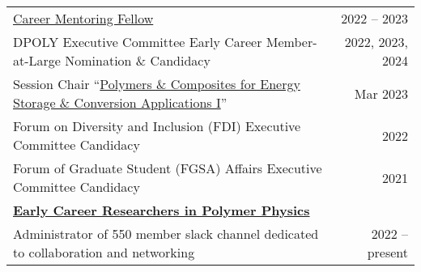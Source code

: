 \documentclass[letterpaper,11pt]{article}
\begin{document}
\begin{longtable}{@{}p{}r@{}}
  \hspace{3mm} \small \href{https://www.aps.org/careers/guidance/mentoring.cfm}{Career Mentoring Fellow}                                                                                                                 & 2022 -- 2023                                                                \\
  \hspace{3mm} \small DPOLY Executive Committee Early Career Member-at-Large Nomination \& Candidacy                                                                                                                     & 2022, 2023, 2024                                                            \\   
  \hspace{3mm} \small Session Chair ``\href{https://meetings.aps.org/Meeting/MAR23/Session/Y15}{Polymers \& Composites for Energy Storage \& Conversion Applications I}''                                      & Mar 2023                                                                    \\
  \hspace{3mm} \small Forum on Diversity and Inclusion (FDI) Executive Committee Candidacy                                                                                                                               & 2022                                                                        \\
  \hspace{3mm} \small Forum of Graduate Student (FGSA) Affairs Executive Committee Candidacy                                                                                                                             & 2021                                                                        \\ [4pt]
  \multicolumn{2}{l}{\hspace{-3mm} \bf{\href{https://sites.google.com/view/polymerphysics/}{Early Career Researchers in Polymer Physics}}}                                                                                                                                                             \\
  \hspace{3mm} \small Administrator of 550 member slack channel dedicated to collaboration and networking                                                                                                                & 2022 -- present                                                             \\

\end{longtable}
\end{document}
